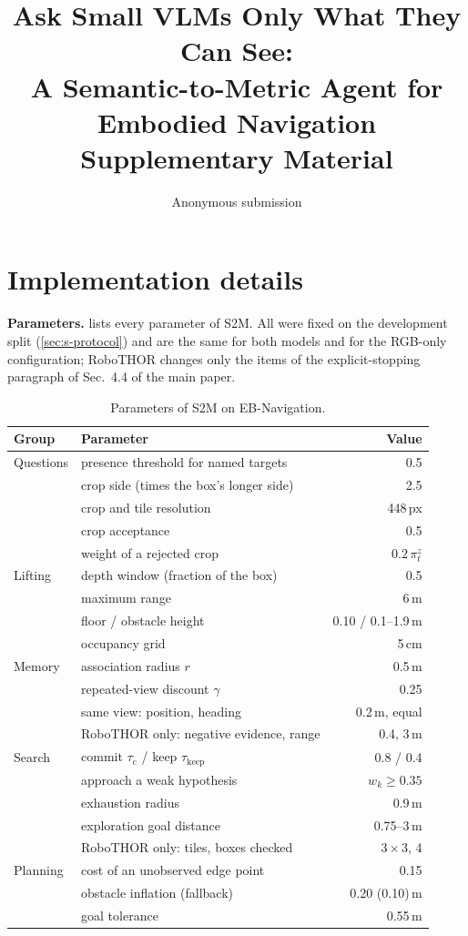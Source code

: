 \documentclass[10pt,twocolumn,letterpaper]{article}
\title{Ask Small VLMs Only What They Can See:\\A Semantic-to-Metric Agent for Embodied Navigation\\[0.3em]
\large Supplementary Material}
\author{Anonymous submission}
\newcommand{\ours}{S2M\xspace}
\begin{document}
\maketitle

\section{Implementation details}
\label{sec:s-impl}

\noindent\textbf{Parameters.}
 lists every parameter of \ours. All were fixed on the development split (\cref{sec:s-protocol})
and are the same for both models and for the RGB-only configuration; RoboTHOR changes only the items of the
explicit-stopping paragraph of Sec.~4.4 of the main paper.

\begin{table}[t]
\centering\small
\caption{Parameters of \ours on EB-Navigation.}
\label{tab:s-params}
\footnotesize\setlength{\tabcolsep}{3pt}
\begin{tabular}{@{}llr@{}}
\toprule
Group & Parameter & Value\\
\midrule
Questions & presence threshold for named targets & 0.5\\
 & crop side (times the box's longer side) & 2.5\\
 & crop and tile resolution & 448\,px\\
 & crop acceptance & 0.5\\
 & weight of a rejected crop & $0.2\,\pi^z_t$\\
Lifting & depth window (fraction of the box) & 0.5\\
 & maximum range & 6\,m\\
 & floor / obstacle height & 0.10 / 0.1--1.9\,m\\
 & occupancy grid & 5\,cm\\
Memory & association radius $r$ & 0.5\,m\\
 & repeated-view discount $\gamma$ & 0.25\\
 & same view: position, heading & 0.2\,m, equal\\
 & RoboTHOR only: negative evidence, range & 0.4, 3\,m\\
Search & commit $\tau_\mathrm{c}$ / keep $\tau_\mathrm{keep}$ & 0.8 / 0.4\\
 & approach a weak hypothesis & $w_k\ge0.35$\\
 & exhaustion radius & 0.9\,m\\
 & exploration goal distance & 0.75--3\,m\\
 & RoboTHOR only: tiles, boxes checked & $3{\times}3$, 4\\
Planning & cost of an unobserved edge point & 0.15\\
 & obstacle inflation (fallback) & 0.20 (0.10)\,m\\
 & goal tolerance & 0.55\,m\\
\bottomrule
\end{tabular}
\end{table}
\end{document}

